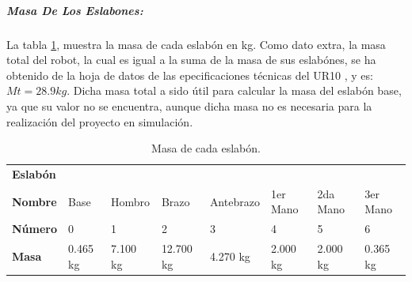 \documentclass{article}
\begin{document}
\begin{sloppypar}
\subparagraph{Masa De Los Eslabones:}
\label{sec:Masa De Los Eslabones:}
\hfill \break
La tabla \ref{table:Masa de cada eslabón}, muestra la masa de cada eslabón en kg.
Como dato extra, la masa total del robot, la cual es igual a la suma de la masa de sus eslabónes, se ha obtenido de la hoja de datos de las epecificaciones técnicas del UR10 \cite{UR10_Especificaciones_Técnicas}, y es: $Mt = 28.9 kg$. Dicha masa total a sido útil para calcular la masa del eslabón base, ya que su valor no se encuentra, aunque dicha masa no es necesaria para la realización del proyecto en simulación.
\begin{table}[H]
\centering
\begin{tabular}{|l|lllllll|}
\cline{1-1}
\textbf{Eslabón}                                                                                  \\ \cline{1-8}
\textbf{Nombre}  & Base     & Hombro   & Brazo     & Antebrazo & 1er Mano  & 2da Mano  & 3er Mano \\ \cline{1-8}
\textbf{Número}  & 0        & 1        & 2         & 3         & 4         & 5         & 6        \\ \cline{1-8}
\textbf{Masa}    & 0.465 kg & 7.100 kg & 12.700 kg & 4.270 kg  & 2.000 kg  & 2.000 kg  & 0.365 kg \\ \cline{1-8}
\end{tabular}
\caption{\label{table:Masa de cada eslabón}Masa de cada eslabón.}
\end{table}



\end{sloppypar}
\end{document}
